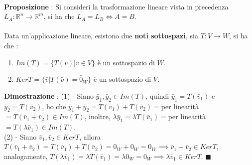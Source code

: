\documentclass[12pt, letterpaper]{article}
\newcommand{\R}{{\mathbb R}}
\newcommand{\ve}{{\bar v}}
\newcommand{\acc}{\\\hphantom{}\\}
\begin{document}
 \begin{figure}[h]
    \end{figure}\\
\textbf{Proposizione }: Si consideri la trasformazione lineare vista in precedenza \(L_A:\R^n\rightarrow \R^m\), si ha 
che \(L_A=L_B\iff A=B\).\acc 
Data un'applicazione lineare, esistono due \textbf{noti sottospazi}, sia \(T:V\rightarrow W\), si ha che : \begin{enumerate}
    \item \(Im(T)=\{T(\bar v)|\bar v\in V\}\) è un sottospazio di \(W\).
    \item \(KerT=\{\ve | T(\ve)= \bar 0_W\}\) è un sottospazio di \(V\).
\end{enumerate}
\textbf{Dimostrazione }: (1) - Siano \(\bar y_1,\bar y_2 \in Im(T)\), quindi \(\bar y_1=T(\ve_1)\) e \(\bar y_2=T(\ve_2)\), 
ho che \(\bar y_1 +\bar y_2 = T(\ve_1)+T(\ve_2)=\)per linearità\(=T(\ve_1+\ve_2)\in Im(T)\), inoltre, \(\lambda\bar y_1=
\lambda T(\ve_1)=\)per linearità\(=T(\lambda\ve_1)\in Im(T)\). \\(2) - Siano \(\ve_1,\ve_2\in KerT\), allora 
\(T(\ve_1+\ve_2)=T(\ve_1)+T(\ve_2)=0_W+0_W=0_W\implies \ve_1+\ve_2\in KerT\), analogamente, \(T(\lambda \ve_1)=\lambda T(\ve_1)
=\lambda 0_W=0_W\implies \lambda \ve_1 \in KerT\). \(\blacksquare\)
\end{document}
